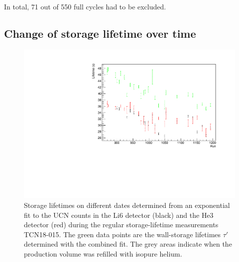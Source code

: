 \documentclass[10pt,letterpaper]{article}
\begin{document}
In total, 71 out of 550 full cycles had to be excluded.

\subsection{Change of storage lifetime over time}

\begin{figure}
\centering
\includegraphics[width=\textwidth,page=2]{../storagelifetime/dailytau.pdf}
\caption{Storage lifetimes on different dates determined from an exponential fit to the UCN counts in the Li6 detector (black) and the He3 detector (red) during the regular storage-lifetime measurements TCN18-015. The green data points are the wall-storage lifetimes $\tau'$ determined with the combined fit. The grey areas indicate when the production volume was refilled with isopure helium.}
\label{fig:dailytau}
\end{figure}
\end{document}
